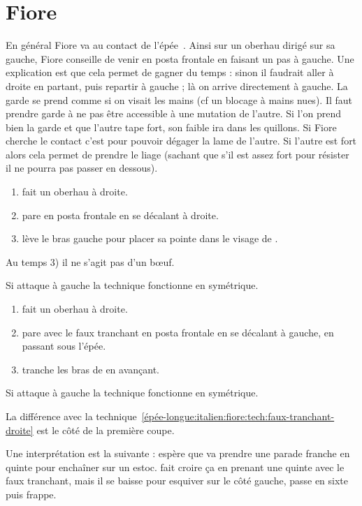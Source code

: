 \section{Fiore}


En général Fiore va au contact de l'épée~\footnotemark{}.%
Ainsi sur un oberhau dirigé sur sa gauche, Fiore conseille de venir en posta frontale en faisant un pas à gauche.
Une explication est que cela permet de gagner du temps : sinon il faudrait aller à droite en partant, puis repartir à gauche ; là on arrive directement à gauche.
La garde se prend comme si on visait les mains (cf un blocage à mains nues).
Il faut prendre garde à ne pas être accessible à une mutation de l'autre.
Si l'on prend bien la garde et que l'autre tape fort, son faible ira dans les quillons.
Si Fiore cherche le contact c'est pour pouvoir dégager la lame de l'autre.
Si l'autre est fort alors cela permet de prendre le liage (sachant que s'il est assez fort pour résister il ne pourra pas passer en dessous).


\begin{technique}

\begin{enumerate}
	\item \A fait un oberhau à droite.
	\item \D pare en posta frontale en se décalant à droite.
	\item \D lève le bras gauche pour placer sa pointe dans le visage de \A.
\end{enumerate}

Au temps 3) il ne s'agit pas d'un bœuf.

Si \A attaque à gauche la technique fonctionne en symétrique.

\end{technique}


\begin{technique}
\label{épée-longue:italien:fiore:tech:posta-frontale-faux-tranchant}

\begin{enumerate}
	\item \A fait un oberhau à droite.
	\item \D pare avec le faux tranchant en posta frontale en se décalant à gauche, en passant sous l'épée.
	\item \D tranche les bras de \A en avançant.
\end{enumerate}

Si \A attaque à gauche la technique fonctionne en symétrique.

La différence avec la technique~\ref{épée-longue:italien:fiore:tech:faux-tranchant-droite} est le côté de la première coupe.

Une interprétation est la suivante : \A espère que \D va prendre une parade franche en quinte pour enchaîner sur un estoc.
\D fait croire ça en prenant une quinte avec le faux tranchant, mais il se baisse pour esquiver sur le côté gauche, passe en sixte puis frappe.

\end{technique}


